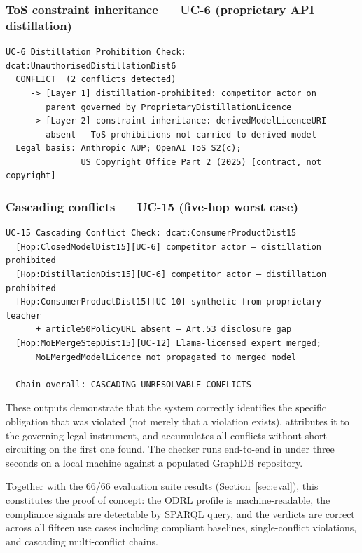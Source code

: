 \documentclass[12pt,a4paper]{article}
\begin{document}
\subsubsection*{ToS constraint inheritance — UC-6 (proprietary API distillation)}

\begin{lstlisting}[language={}]
  UC-6 Distillation Prohibition Check: dcat:UnauthorisedDistillationDist6
  CONFLICT  (2 conflicts detected)
     -> [Layer 1] distillation-prohibited: competitor actor on
        parent governed by ProprietaryDistillationLicence
     -> [Layer 2] constraint-inheritance: derivedModelLicenceURI
        absent — ToS prohibitions not carried to derived model
  Legal basis: Anthropic AUP; OpenAI ToS S2(c);
               US Copyright Office Part 2 (2025) [contract, not copyright]
\end{lstlisting}

\subsubsection*{Cascading conflicts — UC-15 (five-hop worst case)}

\begin{lstlisting}[language={}]
  UC-15 Cascading Conflict Check: dcat:ConsumerProductDist15
  [Hop:ClosedModelDist15][UC-6] competitor actor — distillation prohibited
  [Hop:DistillationDist15][UC-6] competitor actor — distillation prohibited
  [Hop:ConsumerProductDist15][UC-10] synthetic-from-proprietary-teacher
      + article50PolicyURL absent — Art.53 disclosure gap
  [Hop:MoEMergeStepDist15][UC-12] Llama-licensed expert merged;
      MoEMergedModelLicence not propagated to merged model

  Chain overall: CASCADING UNRESOLVABLE CONFLICTS
\end{lstlisting}

\noindent These outputs demonstrate that the system correctly identifies the specific obligation that was violated (not merely that a violation exists), attributes it to the governing legal instrument, and accumulates all conflicts without short-circuiting on the first one found. The checker runs end-to-end in under three seconds on a local machine against a populated GraphDB repository.

Together with the 66/66 evaluation suite results (Section~\ref{sec:eval}), this constitutes the proof of concept: the ODRL profile is machine-readable, the compliance signals are detectable by SPARQL query, and the verdicts are correct across all fifteen use cases including compliant baselines, single-conflict violations, and cascading multi-conflict chains.
\end{document}
